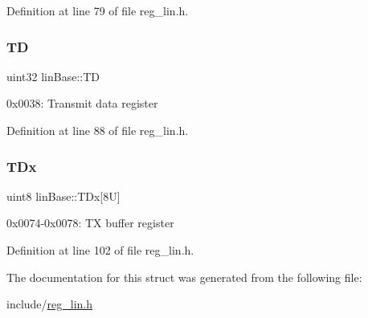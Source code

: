 Definition at line 79 of file reg\+\_\+lin.\+h.

\mbox{\label{structlinBase_ae0f3e7ace2cb9e080aa482f907647e58}} 
\subsubsection{\texorpdfstring{TD}{TD}}
{\footnotesize\ttfamily uint32 lin\+Base\+::\+TD}

0x0038\+: Transmit data register 

Definition at line 88 of file reg\+\_\+lin.\+h.

\mbox{\label{structlinBase_a2c4ec84e80aabf2b48d6dda044d04a52}} 
\subsubsection{\texorpdfstring{T\+Dx}{TDx}}
{\footnotesize\ttfamily uint8 lin\+Base\+::\+T\+Dx\mbox{[}8\+U\mbox{]}}

0x0074-\/0x0078\+: TX buffer register 

Definition at line 102 of file reg\+\_\+lin.\+h.



The documentation for this struct was generated from the following file\+:\begin{DoxyCompactItemize}
\item 
include/\mbox{\hyperlink{reg__lin_8h}{reg\+\_\+lin.\+h}}\end{DoxyCompactItemize}
